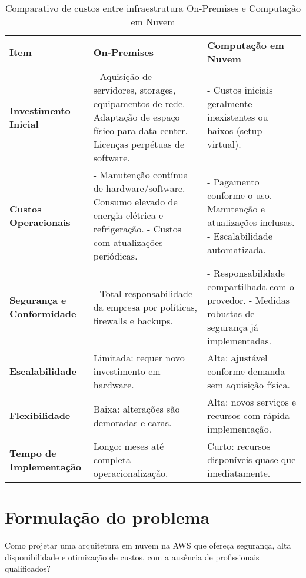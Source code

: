 \begin{table}[H]
\centering
\caption{Comparativo de custos entre infraestrutura On-Premises e Computação em Nuvem}
\label{tab:comparativo-custos}
\begin{tabular}{|p{4cm}|p{6cm}|p{6cm}|}
\hline
\textbf{Item} & \textbf{On-Premises} & \textbf{Computação em Nuvem} \\
\hline
\textbf{Investimento Inicial} & 
- Aquisição de servidores, storages, equipamentos de rede. \newline
- Adaptação de espaço físico para data center. \newline
- Licenças perpétuas de software. &
- Custos iniciais geralmente inexistentes ou baixos (setup virtual). \\
\hline
\textbf{Custos Operacionais} & 
- Manutenção contínua de hardware/software. \newline
- Consumo elevado de energia elétrica e refrigeração. \newline
- Custos com atualizações periódicas. &
- Pagamento conforme o uso. \newline
- Manutenção e atualizações inclusas. \newline
- Escalabilidade automatizada.\\
\hline
\textbf{Segurança e Conformidade} & 
- Total responsabilidade da empresa por políticas, firewalls e backups. &
- Responsabilidade compartilhada com o provedor. \newline
- Medidas robustas de segurança já implementadas. \\
\hline
\textbf{Escalabilidade} & Limitada: requer novo investimento em hardware. & Alta: ajustável conforme demanda sem aquisição física. \\
\hline
\textbf{Flexibilidade} & Baixa: alterações são demoradas e caras. & Alta: novos serviços e recursos com rápida implementação. \\
\hline
\textbf{Tempo de Implementação} & Longo: meses até completa operacionalização. & Curto: recursos disponíveis quase que imediatamente. \\
\hline
\end{tabular}
\end{table}


\section{Formulação do problema}
\label{sec:intro:form_prob}
Como projetar uma arquitetura em nuvem na AWS que ofereça segurança, alta disponibilidade e otimização de custos, com a ausência de profissionais qualificados?


